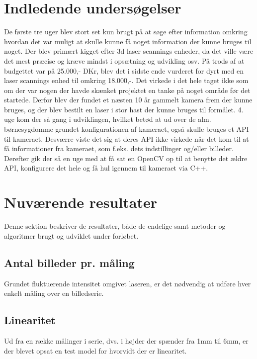 \section{Indledende undersøgelser}
De første tre uger blev stort set kun brugt på at søge efter information omkring hvordan det var muligt at skulle kunne få noget information der kunne bruges til noget. Der blev primært kigget efter 3d laser scannings enheder, da det ville være det mest præcise og kræve mindst i opsætning og udvikling osv. På trods af at budgettet var på 25.000,- DKr, blev det i sidste ende vurderet for dyrt med en laser scannings enhed til omkring 18.000,-. Det virkede i det hele taget ikke som om der var nogen der havde skænket projektet en tanke på noget område før det startede.
Derfor blev der fundet et næsten 10 år gammelt kamera frem der kunne bruges, og der blev bestilt en laser i stor hast der kunne bruges til formålet.
4. uge kom der så gang i udviklingen, hvilket betød at ud over de alm. børnesygdomme grundet konfigurationen af kameraet, også skulle bruges et API til kameraet. Desværre viste det sig at deres API ikke virkede når det kom til at få informationer fra kameraet, som f.eks. dets indstillinger og/eller billeder.
Derefter gik der så en uge med at få sat en OpenCV op til at benytte det ældre API, konfigurere det hele og få hul igennem til kameraet via C++.


\section{Nuværende resultater}

Denne sektion beskriver de resultater, både de endelige samt metoder og algoritmer brugt og udviklet under forløbet.

\subsection{Antal billeder pr. måling}

Grundet fluktuerende intensitet omgivet laseren, er det nødvendig at udføre hver enkelt måling over en billedserie.

\subsection{Linearitet}

Ud fra en række målinger i serie, dvs. i højder der spænder fra 1mm til 6mm, er der blevet opsat en test model for hvorvidt der er linearitet.


